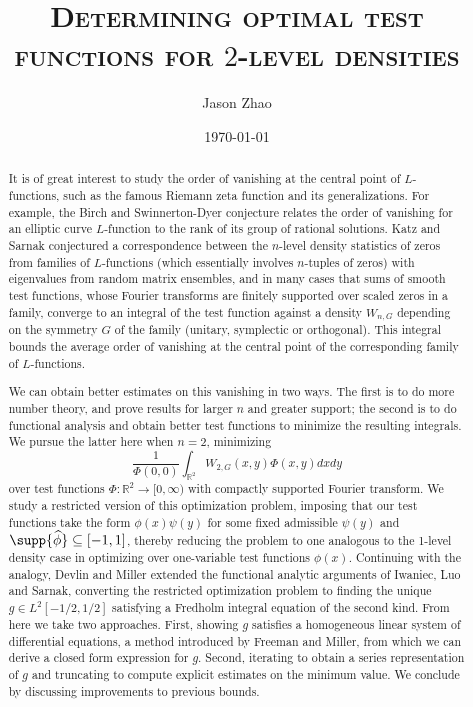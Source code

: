 \documentclass[11pt, reqno]{article}
\title
{
	\textsc{Determining optimal test functions for $2$-level densities}
}
\author{Jason Zhao}
\date{\today}
\theoremstyle{definition}
\theoremstyle{remark}
\begin{document}
\begin{titlepage}
\maketitle

\begin{abstract}
	It is of great interest to study the order of vanishing at the central
point of $L$-functions, such as the famous Riemann zeta function and its
generalizations. For example, the Birch and Swinnerton-Dyer conjecture
relates the order of vanishing for an elliptic curve $L$-function to the
rank of its group of rational solutions. Katz and Sarnak conjectured a
correspondence between the $n$-level density statistics of zeros from
families of $L$-functions (which essentially involves $n$-tuples of zeros)
with eigenvalues from random matrix ensembles, and in many cases that sums of smooth test functions, whose Fourier transforms are
finitely supported over scaled zeros in a family, converge to an integral of
the test function against a density $W_{n, G}$ depending on the
symmetry $G$ of the family (unitary, symplectic or orthogonal). This integral bounds the average order of vanishing at the central point of the corresponding family of $L$-functions. 

We can obtain better estimates on this vanishing in two ways. The first is
to do more number theory, and prove results for larger $n$ and greater
support; the second is to do functional analysis and obtain better test
functions to minimize the resulting integrals. We pursue the latter here
when $n=2$, minimizing  
	\[ \frac{1}{\Phi(0, 0)} \int_{{\mathbb R}^2} W_{2,G} (x, y) \Phi(x, y) dx dy \] 
over test functions $\Phi : {\mathbb R}^2
\to [0, \infty)$ with compactly supported Fourier transform. We study a
restricted version of this optimization problem, imposing that our test
functions take the form $\phi(x) \psi(y)$ for some fixed admissible $\psi(y)$ and
$\supp{\widehat \phi} \subseteq [-1, 1]$, thereby reducing the problem to
one analogous to the 1-level density case in optimizing over one-variable
test functions $\phi(x)$. Continuing with the analogy, Devlin and Miller
extended the functional analytic arguments of Iwaniec, Luo and Sarnak,
converting the restricted optimization problem to finding the unique $g
\in L^2[-1/2, 1/2]$ satisfying a Fredholm integral equation of the second
kind. From here we take two approaches. First, showing $g$ satisfies a homogeneous linear system
of differential equations, a method introduced by Freeman and Miller, from
which we can derive a closed form expression for $g$. Second, iterating to obtain a series representation of $g$ and truncating to compute explicit estimates on the minimum value.  We conclude by discussing improvements to previous bounds.
\end{abstract}

\tableofcontents
\end{titlepage}
\end{document}

